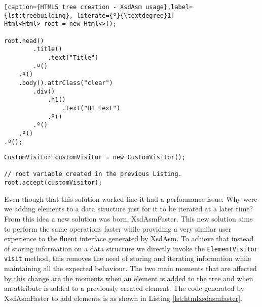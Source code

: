 \bigskip


\begin{minipage}{\linewidth}
\begin{lstlisting}[caption={HTML5 tree creation - XsdAsm usage},label={lst:treebuilding}, literate={º}{\textdegree}1]
Html<Html> root = new Html<>();

root.head()
        .title()
            .text("Title")
        .º()
    .º()
    .body().attrClass("clear")
        .div()
        	.h1()
        		.text("H1 text")
        	.º()
        .º()
    .º()
.º();
\end{lstlisting}
\end{minipage}

\bigskip


\begin{minipage}{\linewidth}
\begin{lstlisting}[caption={HTML5 tree visit - XsdAsm usage},label={lst:treevisit}]
CustomVisitor customVisitor = new CustomVisitor();

// root variable created in the previous Listing.
root.accept(customVisitor);
\end{lstlisting}
\end{minipage}

\noindent
Even though that this solution worked fine it had a performance issue. Why were we adding elements to a data structure just for it to be iterated at a later time? From this idea a new solution was born, XsdAsmFaster. This new solution aims to perform the same operations faster while providing a very similar user experience to the fluent interface generated by XsdAsm. To achieve that instead of storing information on a data structure we directly invoke the \texttt{ElementVisitor visit} method, this removes the need of storing and iterating information while maintaining all the expected behaviour. The two main moments that are affected by this change are the moments when an element is added to the tree and when an attribute is added to a previously created element. The code generated by XsdAsmFaster to add elements is as shown in Listing \ref{lst:htmlxsdasmfaster}.

\bigskip



